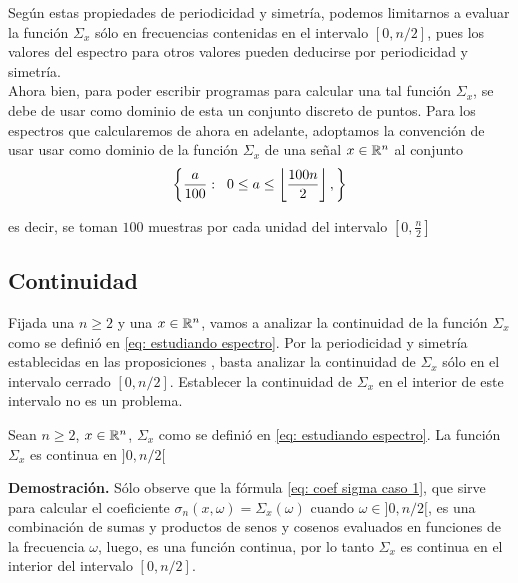 \begin{nota}
\label{nota: muestreo dom frecuencia}
Según estas propiedades de periodicidad y simetría,
podemos limitarnos a evaluar la función
$\Sigma_{x}$ sólo en frecuencias
contenidas en el intervalo $[0, n/2]$, pues los valores
del espectro para otros valores pueden deducirse por periodicidad
y simetría. \\

Ahora bien, para poder escribir programas
para calcular una tal función $\Sigma_{x}$,
se debe de usar como dominio de esta
un conjunto discreto de puntos.
Para los espectros que calcularemos de ahora en 
adelante, adoptamos la convención de 
usar usar como dominio 
de la función
$\Sigma_{x}$ de una señal $x \in \mathbb{R}^{n}$
al conjunto
\begin{equation}
\label{eq: malla frecuencias}
\left\{ \frac{a}{100} : \hspace{0.2cm}
0 \leq a \leq 
\left\lfloor\frac{100n}{2}\right\rfloor,
\right\}
\end{equation}

\noindent
es decir, se toman $100$ muestras por
cada unidad del intervalo 
$\left[ 0, \frac{n}{2}\right]$
\end{nota}

\subsection{Continuidad}

Fijada una $n \geq 2$ y una $x \in \mathbb{R}^{n}$,
vamos a analizar la continuidad de la función
$\Sigma_{x}$ como se definió 
en \eqref{eq: estudiando espectro}.
Por la periodicidad y simetría establecidas
en las proposiciones 
, basta
analizar la continuidad de $\Sigma_{x}$ sólo en el
intervalo cerrado $[0, n/2]$. Establecer la continuidad
de $\Sigma_{x}$ en el interior de este intervalo no es un problema. \\

\begin{prop}
Sean $n \geq 2$, $x \in \mathbb{R}^{n}$,
$\Sigma_{x}$ como se definió en \eqref{eq: estudiando espectro}.
La función $\Sigma_{x}$ es continua en 
$]0, n/2[$
\end{prop}
\noindent
\textbf{Demostración.}
Sólo observe que la fórmula
\eqref{eq: coef sigma caso 1}, que sirve
para calcular el coeficiente $\sigma_{n} (x, \omega) = \Sigma_{x}(\omega)$
cuando $\omega \in ]0, n/2[$, es una combinación
de sumas y productos de senos y cosenos
evaluados en funciones de la frecuencia $\omega$, luego, 
es una función continua, por lo tanto $\Sigma_{x}$
es continua en el interior del intervalo 
$[0, n/2]$.
\QEDB
\vspace{0.2cm}

